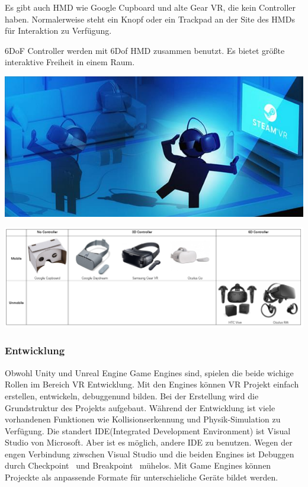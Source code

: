   Es gibt auch HMD wie Google Cupboard und alte Gear VR, die kein Controller haben. Normalerweise steht ein Knopf oder ein Trackpad an der Site des HMDs für Interaktion zu Verfügung.
  
  6DoF Controller werden mit 6Dof HMD zusammen benutzt. Es bietet größte interaktive Freiheit in einem Raum. 
  
\includegraphics[width=\textwidth]{images/6dcontroller.jpg}

\includegraphics[width=\textwidth]{images/vrDevicesTable.png}
  
  \subsubsection{Entwicklung}
  Obwohl Unity und Unreal Engine Game Engines sind, spielen die beide wichige Rollen im Bereich VR Entwicklung. Mit den Engines können VR Projekt einfach erstellen, entwickeln, debuggenund bilden. Bei der Erstellung wird die Grundstruktur des Projekts aufgebaut. Während der Entwicklung ist viele vorhandenen Funktionen wie Kollisionserkennung und Physik-Simulation zu Verfügung. Die standert IDE(Integrated Development Environment) ist Visual Studio von Microsoft. Aber ist es möglich, andere IDE zu benutzen. Wegen der engen Verbindung ziwschen Visual Studio und die beiden Engines ist Debuggen durch \glqq Checkpoint \grqq\ und \glqq Breakpoint \grqq\ mühelos. Mit Game Engines können Projeckte als anpassende Formate für unterschieliche Geräte bildet werden.
  
